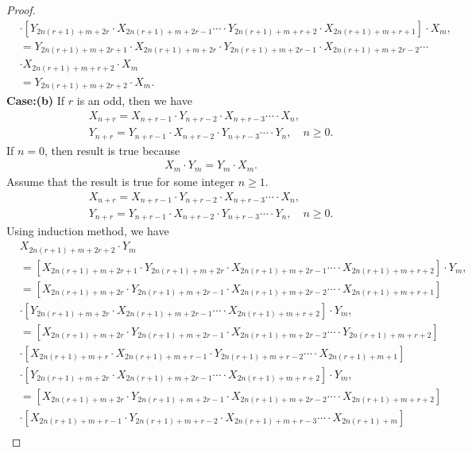 \begin{proof}
\begin{align*}
&\cdot\left[Y_{2n(r+1)+m+2r}\cdot X_{2n(r+1)+m+2r-1}\cdots\cdot Y_{2n(r+1)+m+r+2}\cdot X_{2n(r+1)+m+r+1}\right]\cdot X_{m},\\
&=Y_{2n(r+1)+m+2r+1}\cdot X_{2n(r+1)+m+2r}\cdot Y_{2n(r+1)+m+2r-1}\cdot X_{2n(r+1)+m+2r-2}\cdots\\&\cdot X_{2n(r+1)+m+r+2}\cdot X_{m}\\
&=Y_{2n(r+1)+m+2r+2}\cdot X_{m}.
\end{align*}
\textbf{Case:(b)} If $r$ is an odd, then we have
\begin{align*}
&	X_{n+r}=X_{n+r-1}\cdot Y_{n+r-2}\cdot X_{n+r-3}\cdots\cdot X_{n},\\
	&Y_{n+r}=Y_{n+r-1}\cdot X_{n+r-2}\cdot Y_{n+r-3}\cdots\cdot Y_{n},\quad n\geq 0.
		\end{align*}
		If $n=0$, then result is true because
\begin{align*}
&X_{m}\cdot Y_{m}=Y_{m}\cdot X_{m}.
	\end{align*}
	Assume that the result is true for some integer $n\geq1$.
\begin{align*}
&X_{n+r}=X_{n+r-1}\cdot Y_{n+r-2}\cdot X_{n+r-3}\cdots\cdot X_{n},\\
	&Y_{n+r}=Y_{n+r-1}\cdot X_{n+r-2}\cdot Y_{n+r-3}\cdots\cdot Y_{n},\quad n\geq 0.
		\end{align*}
		Using induction method, we have
\begin{align*}
&X_{2n(r+1)+m+2r+2}\cdot Y_{m}\\&=\left[X_{2n(r+1)+m+2r+1}\cdot Y_{2n(r+1)+m+2r}\cdot X_{2n(r+1)+m+2r-1}\cdots\cdot X_{2n(r+1)+m+r+2}\right]\cdot Y_{m},\\
&=\left[X_{2n(r+1)+m+2r}\cdot Y_{2n(r+1)+m+2r-1}\cdot X_{2n(r+1)+m+2r-2}\cdots\cdot X_{2n(r+1)+m+r+1}\right]\\
&\cdot\left[Y_{2n(r+1)+m+2r}\cdot X_{2n(r+1)+m+2r-1}\cdots\cdot X_{2n(r+1)+m+r+2}\right]\cdot Y_{m},\\
&=\left[X_{2n(r+1)+m+2r}\cdot Y_{2n(r+1)+m+2r-1}\cdot X_{2n(r+1)+m+2r-2}\cdots\cdot Y_{2n(r+1)+m+r+2}\right]\\
&\cdot\left[X_{2n(r+1)+m+r}\cdot X_{2n(r+1)+m+r-1}\cdot Y_{2n(r+1)+m+r-2}\cdots\cdot X_{2n(r+1)+m+1}\right]\\
&\cdot\left[Y_{2n(r+1)+m+2r}\cdot X_{2n(r+1)+m+2r-1}\cdots\cdot X_{2n(r+1)+m+r+2}\right]\cdot Y_{m},\\
&=\left[X_{2n(r+1)+m+2r}\cdot Y_{2n(r+1)+m+2r-1}\cdot X_{2n(r+1)+m+2r-2}\cdots\cdot X_{2n(r+1)+m+r+2}\right]\\
&\cdot\left[X_{2n(r+1)+m+r-1}\cdot Y_{2n(r+1)+m+r-2}\cdot X_{2n(r+1)+m+r-3}\cdots\cdot X_{2n(r+1)+m}\right]\\

\end{align*}
\end{proof}
